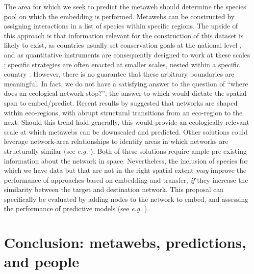 The area for which we seek to predict the metaweb should determine the
species pool on which the embedding is performed. Metawebs can be
constructed by assigning interactions in a list of species within
specific regions. The upside of this approach is that information
relevant for the construction of this dataset is likely to exist, as
countries usually set conservation goals at the national level
\cite{Buxton2021Key}, and as quantitative instruments are consequently
designed to work at these scales \cite{Turak2017Using}; specific
strategies are often enacted at smaller scales, nested within a specific
country \cite{Ray2021Biodiversity}. However, there is no guarantee that
these arbitrary boundaries are meaningful. In fact, we do not have a
satisfying answer to the question of ``where does an ecological network
stop?'', the answer to which would dictate the spatial span to
embed/predict. Recent results by \cite{Martins2022Global} suggested that
networks are shaped within eco-regions, with abrupt structural
transitions from an eco-region to the next. Should this trend hold
generally, this would provide an ecologically-relevant scale at which
metawebs can be downscaled and predicted. Other solutions could leverage
network-area relationships to identify areas in which networks are
structurally similar (see \emph{e.g.} \cite{Fortin2021Network,
Galiana2018Spatial, Galiana2022Ecological}). Both of these solutions
require ample pre-existing information about the network in space.
Nevertheless, the inclusion of species for which we have data but that
are not in the right spatial extent \emph{may} improve the performance
of approaches based on embedding and transfer, \emph{if} they increase
the similarity between the target and destination network. This proposal
can specifically be evaluated by adding nodes to the network to embed,
and assessing the performance of predictive models (see \emph{e.g.}
\cite{Llewelyn2022Predicting}).

\section{Conclusion: metawebs, predictions, and
people}\label{conclusion-metawebs-predictions-and-people}

